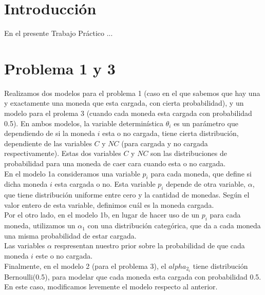 \documentclass[a4paper]{article}
\begin{document}

\maketitle
\newpage

\tableofcontents
\newpage

%
\section{Introducción}
% 
En el presente Trabajo Práctico ...


\section{Problema 1 y 3}
Realizamos dos modelos para el problema 1 (caso en el que sabemos que hay una y exactamente una
moneda que esta cargada, con cierta probabilidad), y un modelo para el prolema 3 (cuando cada
moneda esta cargada con probabilidad 0.5). En ambos modelos, la variable determinística $\theta_i$ es un parámetro que dependiendo de si la moneda $i$ esta o no cargada, tiene
cierta distribución, dependiente de las variables $C$ y $NC$ (para cargada y no cargada 
respectivamente). Estas dos variables $C$ y $NC$ son las distribuciones de probabilidad para
una moneda de caer cara cuando esta o no cargada. \\
En el modelo 1a consideramos una variable $p_i$ para 
cada moneda, que define si dicha moneda $i$ esta cargada o no. Esta variable $p_i$ depende de
otra variable, $\alpha$, que tiene distribución uniforme entre cero y la cantidad de monedas. Según el valor entero de esta variable, definimos cuál es la moneda cargada. \\
Por el otro lado, en el modelo 1b, en lugar de hacer uso de un $p_i$ para cada moneda, 
utilizamos un $\alpha_1$ con una distribución categórica, que da a cada moneda una misma
probabilidad de estar cargada. \\
Las variables $\alpha$ respresentan nuestro prior sobre la probabilidad de que cada moneda $i$
este o no cargada. \\
Finalmente, en el modelo 2 (para el problema 3), el $alpha_{2_i}$ tiene distribución 
Bernoulli(0.5), para modelar que cada moneda esta cargada con probabilidad 0.5. En este caso, modificamos levemente el modelo respecto al anterior. \\
\end{document}
